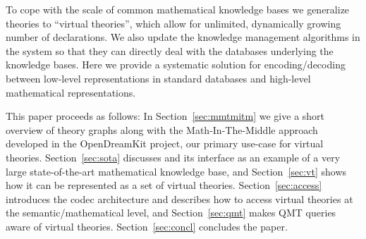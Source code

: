 To cope with the scale of common mathematical knowledge bases we generalize \ommt theories to ``virtual theories'', which allow for unlimited, dynamically growing number of declarations.
We also update the knowledge management algorithms in the \mmt system so that they can directly deal with the databases underlying the knowledge bases.
Here we provide a systematic solution for encoding/decoding between low-level representations in standard databases and high-level mathematical representations.

This paper proceeds as follows: 
In Section~\ref{sec:mmtmitm} we give a short overview of \ommt theory graphs along with the Math-In-The-Middle approach developed in the \textsf{OpenDreamKit} project, our primary use-case for virtual theories. 
Section~\ref{sec:sota} discusses \lmfdb and its interface as an example of a very large state-of-the-art mathematical knowledge base, and Section~\ref{sec:vt} shows how it can be represented as a set of virtual theories. 
Section~\ref{sec:access} introduces the codec architecture and describes how to access virtual theories at the semantic/mathematical level, and Section~\ref{sec:qmt} makes QMT queries aware of virtual theories. 
Section~\ref{sec:concl} concludes the paper.


